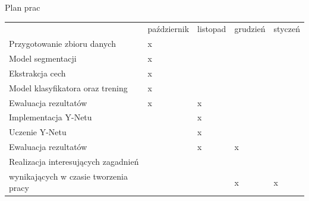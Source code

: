 \documentclass[10pt]{beamer}
\begin{document}
\begin{frame}{Plan prac}
    \begin{table}[]

        \begin{adjustbox}{width=\columnwidth,center}
        \begin{tabular}{lllll}
                                                                                & październik & listopad & grudzień & styczeń \\
        Przygotowanie zbioru danych                                                & x           &          &          &         \\ \hline
        Model segmentacji                                                          & x           &          &          &         \\ \hline
        Ekstrakcja cech                                                            & x           &          &          &         \\ \hline
        Model klasyfikatora oraz trening                                           & x           &          &          &         \\ \hline
        Ewaluacja rezultatów                                                       & x           & x        &          &         \\ \hline \hline
        Implementacja Y-Netu                                                       &             & x        &          &         \\ \hline
        Uczenie Y-Netu                                                             &             & x        &          &         \\ \hline
        Ewaluacja rezultatów                                                       &             & x        & x        &         \\ \hline
        Realizacja interesujących zagadnień\\ wynikających w czasie tworzenia pracy &             &          & x        & x      
        \end{tabular}
        \end{adjustbox}
        \end{table}
\end{frame}
\end{document}
